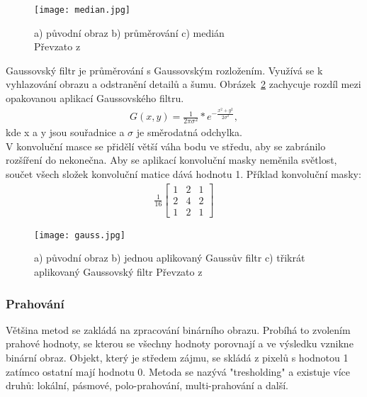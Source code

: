 \begin{figure}[h]
\centering
\texttt{[image: median.jpg]}
\caption{a) původní obraz b) průměrování c) medián\\
 Převzato z ~\cite{15} }
 \label{pic1}
\end{figure}

\newpage
Gaussovský filtr je průměrování s Gaussovským rozložením. Využívá se k vyhlazování obrazu a odstranění detailů a šumu. Obrázek~\ref{pic2} zachycuje rozdíl mezi opakovanou aplikací Gaussovského filtru.
\begin{eqnarray}
G(x,y) = \frac{1}{2 \pi \sigma^{2}}*e^{-\frac{x^{2}+y^{2}}{2\sigma^{2}}}  ,
\end{eqnarray}
kde x a y jsou souřadnice a $ \sigma $ je směrodatná odchylka.\\

V konvoluční masce se přidělí větší váha bodu ve středu, aby se zabránilo rozšíření do nekonečna. Aby se aplikací konvoluční masky neměnila světlost, součet všech složek konvoluční matice dává hodnotu 1. Příklad konvoluční masky:
\begin{eqnarray}
\frac{1}{16} \begin{bmatrix}
1 & 2 & 1 \\
2 & 4 & 2 \\
1 & 2 & 1
\end{bmatrix}
\end{eqnarray} 

\begin{figure}[h]
\centering
\texttt{[image: gauss.jpg]}
\caption{a) původní obraz b) jednou aplikovaný Gaussův filtr c) třikrát aplikovaný Gaussovský filtr
Převzato z ~\cite{15} }
\label{pic2}
\end{figure}

\subsubsection{Prahování} %
Většina metod se zakládá na zpracování binárního obrazu. Probíhá to zvolením prahové hodnoty, se kterou se všechny hodnoty porovnají a ve výsledku vznikne binární obraz. Objekt, který je středem zájmu, se skládá z pixelů s hodnotou 1 zatímco ostatní mají hodnotu 0. Metoda se nazývá "tresholding" a existuje více druhů: lokální, pásmové, polo-prahování, multi-prahování a další.~\cite{hlav}

